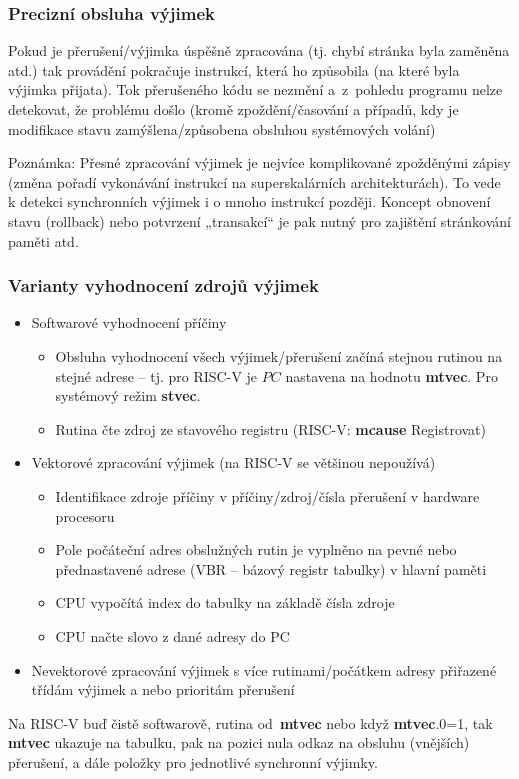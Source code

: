 \documentclass{beamer}
\begin{document}
\begin{frame}
\frametitle{Precizní obsluha výjimek}

Pokud je přerušení/výjimka úspěšně zpracována (tj. chybí
stránka byla zaměněna atd.) tak provádění pokračuje
instrukcí, která ho způsobila (na které byla výjimka přijata).
Tok přerušeného kódu se nezmění a~z~pohledu programu nelze
detekovat, že problému došlo (kromě zpoždění/časování a případů,
kdy je modifikace  stavu zamýšlena/způsobena obsluhou systémových
volání)

\vspace{3mm}

Poznámka: Přesné zpracování výjimek je nejvíce komplikované
zpožděnými zápisy (změna pořadí vykonávání instrukcí na superskalárních architekturách).
To vede k detekci synchronních výjimek i o mnoho
instrukcí později. Koncept obnovení stavu (rollback) nebo
potvrzení „transakcí“ je pak nutný pro zajištění stránkování paměti atd.
\end{frame}

\begin{frame}
\frametitle{Varianty vyhodnocení zdrojů výjimek}

\begin{itemize}
 \item Softwarové vyhodnocení příčiny
 \begin{itemize}
  \item Obsluha vyhodnocení všech výjimek/přerušení začíná stejnou rutinou na stejné adrese --
        tj. pro RISC-V je $PC$ nastavena na hodnotu \textbf{mtvec}. Pro systémový režim \textbf{stvec}.
  \item Rutina čte zdroj ze stavového registru (RISC-V: \textbf{mcause} Registrovat)
 \end{itemize}
 \item Vektorové zpracování výjimek (na RISC-V se většinou nepoužívá)
 \begin{itemize}
  \item Identifikace zdroje příčiny v příčiny/zdroj/čísla přerušení v hardware procesoru
  \item Pole počáteční adres obslužných rutin je vyplněno na pevné nebo přednastavené adrese
  (VBR -- bázový registr tabulky) v hlavní paměti
  \item CPU vypočítá index do tabulky na základě čísla zdroje
  \item CPU načte slovo z dané adresy do PC
 \end{itemize}
 \item Nevektorové zpracování výjimek s více rutinami/počátkem
       adresy přiřazené třídám výjimek a nebo prioritám přerušení
\end{itemize}

\footnotesize

Na RISC-V buď čistě softwarově, rutina od~\textbf{mtvec} nebo když \textbf{mtvec}.0=1, tak \textbf{mtvec} ukazuje na tabulku,
pak na pozici nula odkaz na obsluhu (vnějších) přerušení, a dále položky pro jednotlivé synchronní výjimky.
\end{frame}
\end{document}
